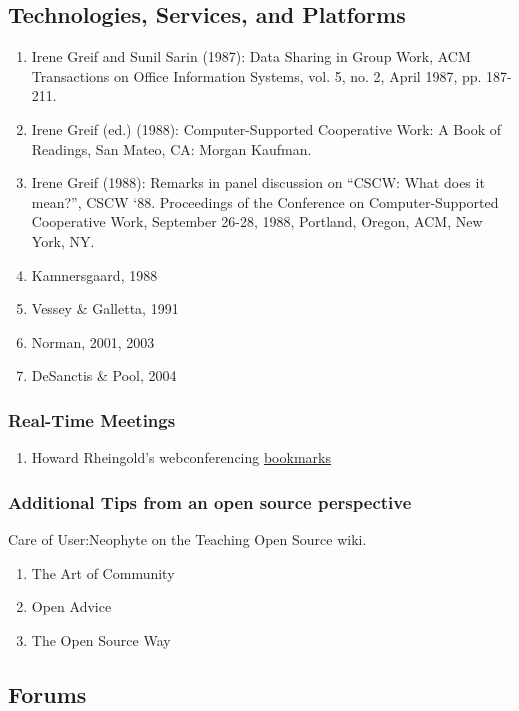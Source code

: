 \subsection{Technologies, Services, and Platforms}

\begin{enumerate}
\item
  Irene Greif and Sunil Sarin (1987): Data Sharing in Group Work, ACM
  Transactions on Office Information Systems, vol. 5, no. 2, April 1987,
  pp. 187-211.
\item
  Irene Greif (ed.) (1988): Computer-Supported Cooperative Work: A Book
  of Readings, San Mateo, CA: Morgan Kaufman.
\item
  Irene Greif (1988): Remarks in panel discussion on ``CSCW: What does
  it mean?'', CSCW `88. Proceedings of the Conference on
  Computer-Supported Cooperative Work, September 26-28, 1988, Portland,
  Oregon, ACM, New York, NY.
\item
  Kamnersgaard, 1988
\item
  Vessey \& Galletta, 1991
\item
  Norman, 2001, 2003
\item
  DeSanctis \& Pool, 2004
\end{enumerate}

\subsubsection{Real-Time Meetings}

\begin{enumerate}
\item Howard Rheingold's webconferencing \href{http://delicious.com/hrheingold/webconferencing}{bookmarks}
\end{enumerate}

\subsubsection{Additional Tips from an open source perspective}

Care of User:Neophyte on the Teaching Open Source wiki.

\begin{enumerate}
\item
  The Art of Community
\item
  Open Advice
\item
  The Open Source Way
\end{enumerate}
\subsection{Forums}

